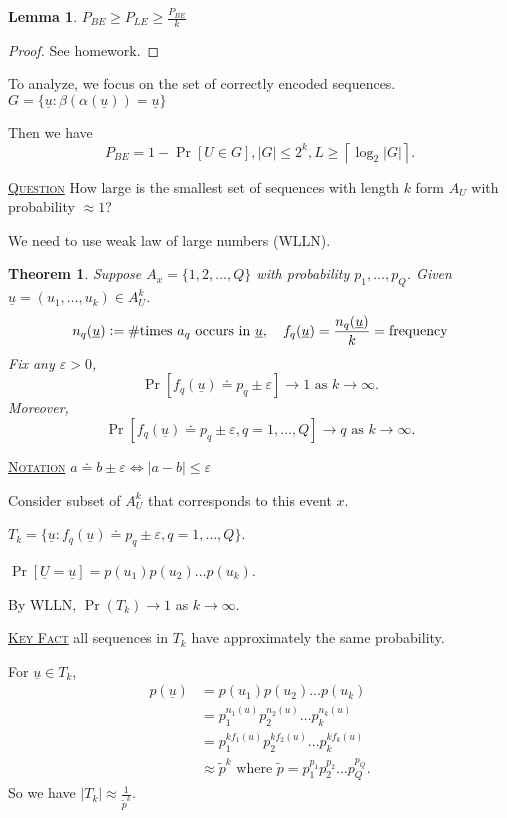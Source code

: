 \documentclass{report}
\newcommand{\ceil}[1]{\left\lceil #1 \right\rceil}
\newcommand{\defeq}{\vcentcolon=}
\newcommand{\fancyem}[1]{\underline{\textsc{#1}}}
\newtheorem{theorem}{Theorem}[section]
\newtheorem{lemma}{Lemma}[section]
\theoremstyle{definition}
\theoremstyle{remark}
\numberwithin{equation}{section}
\begin{document}
\begin{lemma}
  $P_{BE} \geq P_{LE} \geq \frac{P_{BE}}{k}$
\end{lemma}
\begin{proof}
  See homework.
\end{proof}

To analyze, we focus on the set of correctly encoded sequences. $G = \{\underline{u}: \beta(\alpha(\underline{u})) = \underline{u}\}$

Then we have \[P_{BE} = 1 - \Pr[U \in G], |G| \leq 2^k, L \geq \ceil{\log_2|G|}.\]

\fancyem{Question} How large is the smallest set of sequences with length $k$ form $A_U$ with probability $\approx 1$? 

We need to use weak law of large numbers (WLLN).

\begin{theorem}
  Suppose $A_x = \{1, 2, \ldots, Q\}$ with probability $p_1, \ldots, p_Q$. Given $\underline{u} = (u_1, \ldots, u_k) \in A^k_U$.
  \[
    n_q(\underline{u}) \defeq \# \text{times $a_q$ occurs in $\underline{u}$}, \quad f_q(\underline{u}) = \frac{n_q(\underline{u})}{k} = \text{frequency}
  \]
  Fix any $\varepsilon > 0$, \[
    \Pr[f_q(\underline{u}) \doteq p_q \pm \varepsilon] \to 1 \text{ as } k \to \infty.
  \] Moreover,
  \[
    \Pr[f_q(\underline{u}) \doteq p_q \pm \varepsilon, q = 1, \ldots, Q] \to q \text{ as } k \to \infty.  
  \]
\end{theorem}
\fancyem{Notation} $a \doteq b \pm \varepsilon \iff |a - b| \leq \varepsilon$

Consider subset of $A^k_U$ that corresponds to this event $x$.

$T_k = \{\underline{u}: f_q(\underline{u}) \doteq p_q \pm \varepsilon, q = 1, \ldots, Q\}$.

$\Pr[\underline{U} = \underline{u}] = p(u_1)p(u_2)\ldots p(u_k)$.

By WLLN, $\Pr(T_k) \to 1$ as $k \to \infty$.

\fancyem{Key Fact} all sequences in $T_k$ have approximately the same probability.

For $\underline{u} \in T_k$,
\begin{align*}
  p(\underline{u}) & = p(u_1)p(u_2)\ldots p(u_k) \\
  & = p_1^{n_1(u)}p_2^{n_2(u)}\ldots p_k^{n_k(u)} \\
  & = p_1^{kf_1(u)}p_2^{kf_2(u)}\ldots p_k^{kf_k(u)} \\
  & \approx \tilde{p}^k \text{ where } \tilde{p} = p_1^{p_1}p_2^{p_2} \ldots p_Q^{p_Q}.
\end{align*}
So we have $|T_k| \approx \frac{1}{\tilde{p}^k}$.
\end{document}
